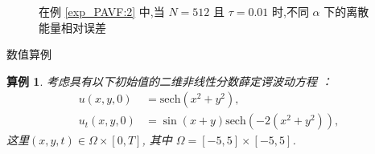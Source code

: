 \documentclass[aspectratio=169]{beamer}
\newtheorem{myexample}{算例}[section] %
\numberwithin{theorem}{section} %
\numberwithin{equation}{section}%
\numberwithin{figure}{section}%
\numberwithin{table}{section}%
\begin{document}
\begin{frame}%
	\begin{figure}[H]
		\begin{center}
		  
		\caption{在例 \ref{exp_PAVF:2} 中,当 $N = 512$ 且 $\tau=0.01$ 时,不同 $\alpha$ 下的离散能量相对误差}\label{fig_PAVF:6}
		\end{center}
		\end{figure}
\end{frame}

\begin{frame}{数值算例}
	\begin{myexample}\label{exp_PAVF:4}
		考虑具有以下初始值的二维非线性分数薛定谔波动方程 ：
		\begin{equation}\label{eq_PAVF_110}
		\begin{aligned}
			u(x,y, 0)&=\mbox{sech}\left(x^2+y^2\right), \\
			u_t(x,y, 0)&=\sin (x+y) \mbox{sech}\left(-2(x^2+y^2)\right),
		\end{aligned}
		\end{equation}
		这里$(x,y,t)\in  \Omega\times[0, T]$, 其中 $\Omega=[-5,5] \times[-5,5]$.
		\end{myexample}
\end{frame}
\end{document}
